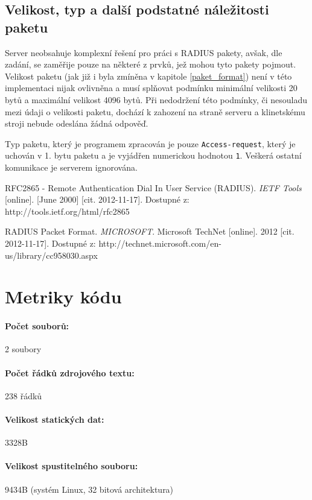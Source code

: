 \documentclass[12pt,a4paper,titlepage,final]{article}
\begin{document}
\subsection{Velikost, typ a další podstatné náležitosti paketu}
Server neobsahuje komplexní řešení pro práci s RADIUS pakety, avšak, dle zadání, se zaměřije pouze na některé z prvků, jež mohou tyto pakety pojmout. Velikost paketu (jak již i byla zmíněna v kapitole \ref{paket_format}) není v této implementaci nijak ovlivněna a musí splňovat podmínku minimální velikosti 20 bytů a maximální velikost 4096 bytů. Při nedodržení této podmínky, či nesouladu mezi údaji o velikosti paketu, dochází k zahození na straně serveru a klinetskému stroji nebude odeslána žádná odpověď.

Typ paketu, který je programem zpracován je pouze \texttt{Access-request}, který je uchován v 1. bytu paketu a je vyjádřen numerickou hodnotou \texttt{1}. Veškerá ostatní komunikace je serverem ignorována.

\newpage			   




\begin{thebibliography}{99}

RFC2865 - Remote Authentication Dial In User Service (RADIUS). \emph{IETF Tools} [online]. [June 2000] [cit. 2012-11-17]. Dostupné z: http://tools.ietf.org/html/rfc2865

RADIUS Packet Format. \emph{MICROSOFT}. Microsoft TechNet [online]. 2012 [cit. 2012-11-17]. Dostupné z: http://technet.microsoft.com/en-us/library/cc958030.aspx



\end{thebibliography}
\newpage



\appendix

\section{Metriky kódu} \label{metriky}
\paragraph{Počet souborů:} 2 soubory
\paragraph{Počet řádků zdrojového textu:} 238 řádků
\paragraph{Velikost statických dat:} 3328B
\paragraph{Velikost spustitelného souboru:} 9434B (systém Linux, 32 bitová
architektura)
\end{document}
